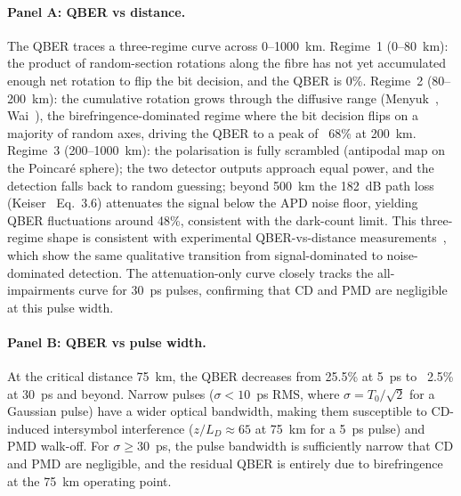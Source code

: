 \documentclass[3p,times,preprint]{elsarticle}
\begin{document}


\paragraph{Panel A: QBER vs distance.}
The QBER traces a three-regime curve across 0--1000~km.
Regime~1 (0--80~km): the product of random-section rotations along the
fibre has not yet accumulated enough net rotation to flip the bit
decision, and the QBER is 0\%.
Regime~2 (80--200~km): the cumulative rotation grows through the
diffusive range (Menyuk~\cite{menyuk}, Wai~\cite{wai}), the
birefringence-dominated regime where the bit decision flips on a
majority of random axes, driving the QBER to a peak of ~68\% at
200~km.
Regime~3 (200--1000~km): the polarisation is fully scrambled
(antipodal map on the Poincar\'e sphere); the two detector outputs
approach equal power, and the detection falls back to random guessing;
beyond 500~km the 182~dB path loss (Keiser~\cite{keiser} Eq.~3.6)
attenuates the signal below the APD noise floor, yielding QBER
fluctuations around 48\%, consistent with the dark-count limit.
This three-regime shape is consistent with experimental QBER-vs-distance
measurements~\cite{gobby,takesue}, which show the same qualitative
transition from signal-dominated to noise-dominated detection.
The attenuation-only curve closely tracks the all-impairments curve
for 30~ps pulses, confirming that CD and PMD are negligible at this
pulse width.

\paragraph{Panel B: QBER vs pulse width.}
At the critical distance 75~km, the QBER decreases from 25.5\% at
5~ps to ~2.5\% at 30~ps and beyond.  Narrow pulses ($\sigma < 10$~ps RMS,
where $\sigma = T_0/\sqrt{2}$ for a Gaussian pulse)
have a wider optical bandwidth, making them susceptible to CD-induced
intersymbol interference ($z/L_D \approx 65$ at 75~km for a 5~ps pulse)
and PMD walk-off.  For $\sigma \ge 30$~ps, the pulse bandwidth is
sufficiently narrow that CD and PMD are negligible, and the residual
QBER is entirely due to birefringence at the 75~km operating point.
\end{document}
